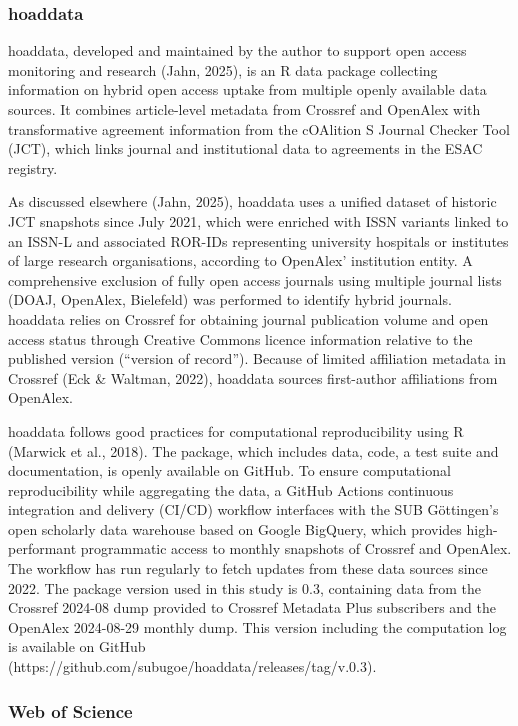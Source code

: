 \documentclass[a4paper,man,floatsintext,longtable,noextraspace,10pt]{apa6}
\begin{document}
\subsubsection{hoaddata}\label{hoaddata}

hoaddata, developed and maintained by the author to support open access
monitoring and research (Jahn, 2025), is an R data package collecting
information on hybrid open access uptake from multiple openly available
data sources. It combines article-level metadata from Crossref and
OpenAlex with transformative agreement information from the cOAlition S
Journal Checker Tool (JCT), which links journal and institutional data
to agreements in the ESAC registry.

As discussed elsewhere (Jahn, 2025), hoaddata uses a unified dataset of
historic JCT snapshots since July 2021, which were enriched with ISSN
variants linked to an ISSN-L and associated ROR-IDs representing
university hospitals or institutes of large research organisations,
according to OpenAlex' institution entity. A comprehensive exclusion of
fully open access journals using multiple journal lists (DOAJ, OpenAlex,
Bielefeld) was performed to identify hybrid journals. hoaddata relies on
Crossref for obtaining journal publication volume and open access status
through Creative Commons licence information relative to the published
version (``version of record''). Because of limited affiliation metadata
in Crossref (Eck \& Waltman, 2022), hoaddata sources first-author
affiliations from OpenAlex.

hoaddata follows good practices for computational reproducibility using
R (Marwick et al., 2018). The package, which includes data, code, a test
suite and documentation, is openly available on GitHub. To ensure
computational reproducibility while aggregating the data, a GitHub
Actions continuous integration and delivery (CI/CD) workflow interfaces
with the SUB Göttingen's open scholarly data warehouse based on Google
BigQuery, which provides high-performant programmatic access to monthly
snapshots of Crossref and OpenAlex. The workflow has run regularly to
fetch updates from these data sources since 2022. The package version
used in this study is 0.3, containing data from the Crossref 2024-08
dump provided to Crossref Metadata Plus subscribers and the OpenAlex
2024-08-29 monthly dump. This version including the computation log is
available on GitHub
(https://github.com/subugoe/hoaddata/releases/tag/v.0.3).

\subsubsection{Web of Science}\label{web-of-science}
\end{document}
